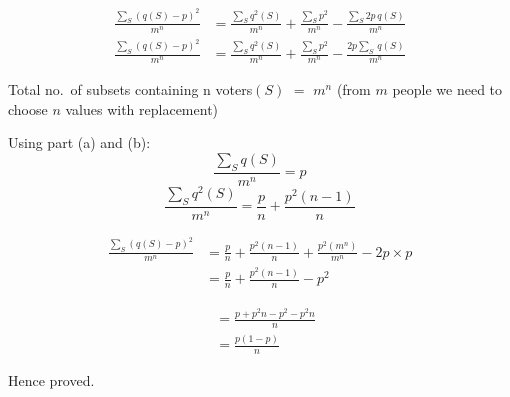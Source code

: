 \documentclass[12pt]{article}
\begin{document}
\begin{align*}
\frac{\sum\limits_S \left( q(S) - p \right)^2}{m^n} 
&= \frac{\sum\limits_S q^2(S)}{m^n} + \frac{\sum\limits_S p^2}{m^n} - \frac{\sum\limits_S 2p\, q(S)}{m^n}
\end{align*}
\begin{align*}
\frac{\sum\limits_S \left( q(S) - p \right)^2}{m^n} 
&= \frac{\sum\limits_S q^2(S)}{m^n} + \frac{\sum\limits_S p^2}{m^n} - \frac{2p \sum\limits_S \, q(S)}{m^n}
\end{align*}

Total no.\ of subsets containing n voters$(S)$ $=$ $m^n$ \quad (from $m$ people we need to choose $n$ values with replacement)  

Using part (a) and (b):  
\[
\frac{\sum\limits_S q(S)}{m^n} = p
\]
\[
\frac{\sum\limits_S q^2(S)}{m^n} = \frac{p}{n} + \frac{p^2 (n-1)}{n}
\]

\begin{align*}
\frac{\sum\limits_S (q(S) - p)^2}{m^n} 
&= \frac{p}{n} + \frac{p^2 (n-1)}{n} + \frac{p^2 (m^n)}{m^n} - 2p \times p \\[4pt]
&= \frac{p}{n} + \frac{p^2 (n-1)}{n} - p^2
\end{align*}

\begin{align*}
&= \frac{p + p^2 n - p^2 - p^2 n}{n} \\[4pt]
&= \frac{p (1 - p)}{n}
\end{align*}

Hence proved.
\end{document}
